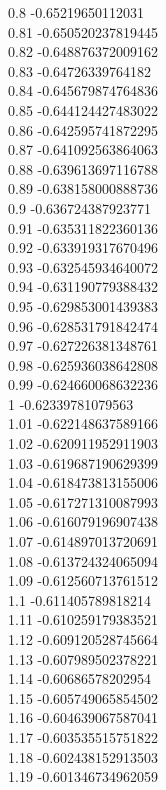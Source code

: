 {0.8	-0.65219650112031\\
0.81	-0.650520237819445\\
0.82	-0.648876372009162\\
0.83	-0.64726339764182\\
0.84	-0.645679874764836\\
0.85	-0.644124427483022\\
0.86	-0.642595741872295\\
0.87	-0.641092563864063\\
0.88	-0.639613697116788\\
0.89	-0.638158000888736\\
0.9	-0.636724387923771\\
0.91	-0.635311822360136\\
0.92	-0.633919317670496\\
0.93	-0.632545934640072\\
0.94	-0.631190779388432\\
0.95	-0.629853001439383\\
0.96	-0.628531791842474\\
0.97	-0.627226381348761\\
0.98	-0.625936038642808\\
0.99	-0.624660068632236\\
1	-0.62339781079563\\
1.01	-0.622148637589166\\
1.02	-0.620911952911903\\
1.03	-0.619687190629399\\
1.04	-0.618473813155006\\
1.05	-0.617271310087993\\
1.06	-0.616079196907438\\
1.07	-0.614897013720691\\
1.08	-0.613724324065094\\
1.09	-0.612560713761512\\
1.1	-0.611405789818214\\
1.11	-0.610259179383521\\
1.12	-0.609120528745664\\
1.13	-0.607989502378221\\
1.14	-0.60686578202954\\
1.15	-0.605749065854502\\
1.16	-0.604639067587041\\
1.17	-0.603535515751822\\
1.18	-0.602438152913503\\
1.19	-0.601346734962059\\
}
